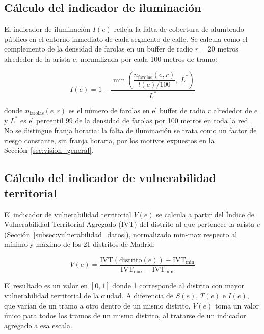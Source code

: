 \subsection{Cálculo del indicador de iluminación}
\label{subsec:indicador_iluminacion}

El indicador de iluminación $I(e)$ refleja la falta de cobertura de alumbrado público en el entorno inmediato de cada segmento de calle. Se calcula como el complemento de la densidad de farolas en un buffer de radio $r = 20$ metros alrededor de la arista $e$, normalizada por cada 100 metros de tramo:

\begin{equation}
    I(e) = 1 - \frac{\min\left(\dfrac{n_{\text{farolas}}(e, r)}{l(e) / 100},\; L^{*}\right)}{L^{*}}
    \label{eq:iluminacion}
\end{equation}

donde $n_{\text{farolas}}(e, r)$ es el número de farolas en el buffer de radio $r$ alrededor de $e$ y $L^{*}$ es el percentil 99 de la densidad de farolas por 100 metros en toda la red. No se distingue franja horaria: la falta de iluminación se trata como un factor de riesgo constante, sin franja horaria, por los motivos expuestos en la Sección~\ref{sec:vision_general}.

\subsection{Cálculo del indicador de vulnerabilidad territorial}
\label{subsec:indicador_vulnerabilidad}

El indicador de vulnerabilidad territorial $V(e)$ se calcula a partir del Índice de Vulnerabilidad Territorial Agregado (IVT) del distrito al que pertenece la arista $e$ (Sección~\ref{subsec:vulnerabilidad_datos}), normalizado min-max respecto al mínimo y máximo de los 21 distritos de Madrid:

\begin{equation}
    V(e) = \frac{\text{IVT}(\text{distrito}(e)) - \text{IVT}_{\min}}{\text{IVT}_{\max} - \text{IVT}_{\min}}
    \label{eq:vulnerabilidad}
\end{equation}

El resultado es un valor en $[0, 1]$ donde 1 corresponde al distrito con mayor vulnerabilidad territorial de la ciudad. A diferencia de $S(e)$, $T(e)$ e $I(e)$, que varían de un tramo a otro dentro de un mismo distrito, $V(e)$ toma un valor único para todos los tramos de un mismo distrito, al tratarse de un indicador agregado a esa escala.

